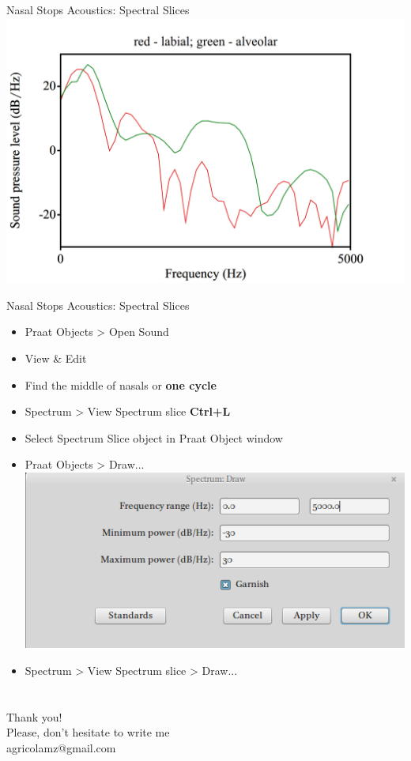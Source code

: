 \begin{frame}{Nasal Stops Acoustics: Spectral Slices}
\includegraphics[width=\linewidth]{01-Spectral-Slice.png}
\end{frame}

\begin{frame}{Nasal Stops Acoustics: Spectral Slices}
\begin{itemize}
\item Praat Objects > Open Sound
\item View \& Edit
\item Find the middle of nasals or \textbf{one cycle}
\item Spectrum > View Spectrum slice \hfill \textbf{Ctrl+L}
\item Select Spectrum Slice object in Praat Object window
\item Praat Objects > Draw...\\
\includegraphics[width=0.8\linewidth]{02-params.png}
\item Spectrum > View Spectrum slice > Draw...
\end{itemize}
\end{frame}

\section{}
\begin{frame}
{\huge Thank you!\bigskip\\
\normalsize Please, don't hesitate to write me\\
agricolamz@gmail.com
\vspace{-130pt}}
\end{frame}

